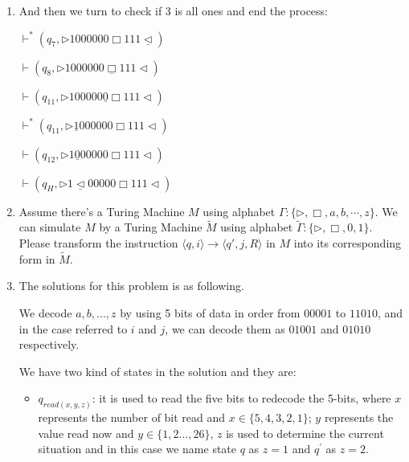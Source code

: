 \documentclass[12pt,a4paper]{article}
\makeatletter
\newtheorem*{solution}{Solution}
\theoremstyle{definition}
\renewenvironment{solution}[1][Solution] {\par\pushQED{\qed}\normalfont\topsep6\p@\@plus6\p@\relax\trivlist\item[\hskip\labelsep\bfseries#1\@addpunct{.}]\ignorespaces}{\popQED\endtrivlist\@endpefalse} \makeatother
\makeatother
\begin{document}
\begin{enumerate}
\begin{solution}
\begin{itemize}
   And then we turn to check if $3$ is all ones and end the process:

   $\vdash^{*} (q_{7},\triangleright  1 0 0 0  0 0 0 \Box 1  1  1 \underline{\triangleleft})$

   $\vdash (q_{8},\triangleright  1 0 0 0  0 0 0 \underline{\Box} 1  1  1 \triangleleft)$
  
   $\vdash (q_{11},\triangleright  1 0 0 0  0 0 \underline{0} \Box 1  1  1 \triangleleft)$

   $\vdash^{*} (q_{11},\triangleright  \underline{1} 0 0 0  0 0 0 \Box 1  1  1 \triangleleft)$

   $\vdash (q_{12},\triangleright  1 \underline{0}  0 0  0 0 0 \Box 1  1  1 \triangleleft)$

   $\vdash (q_{H},\triangleright  1 \underline{\triangleleft}  0 0  0 0 0 \Box 1  1  1 \triangleleft)$


   












\end{itemize}

\end{solution}





\item Assume there's a Turing Machine $M$ using alphabet $\Gamma :\{ \triangleright, \Box, a, b, \cdots, z\}$. We can simulate $M$ by a Turing Machine $\tilde{M}$ using alphabet $\tilde{\Gamma }:\{ \triangleright, \Box, 0, 1\}$. Please transform the instruction $\langle q, i \rangle \rightarrow \langle q',j, R\rangle$ in $M$ into its corresponding form in $\tilde{M}$.


\begin{solution}
    The solutions for this problem is as following.

   We decode $a, b, ..., z$ by using 5 bits of data in order from $00001$ to $11010$, and in the case referred to $i$ and $j$, we can decode them as 
   $01001$ and $01010$ respectively.

	We have two kind of states in the solution and they are:

	\begin{itemize}
		\item \textbf{$q_{read(x,y,z)}$}: it is used to read the five bits to redecode the 5-bits, where $x$ represents the number of bit read and $x\in \{5, 4, 3, 2, 1\}$; $y$ represents the value read now and $y\in \{1,2...,26\}$, $z$ is used
		to determine the current situation and in this case we name state $q$ as $z=1$ and  $q^{'}$ as $z=2$.


\end{itemize}
\end{solution}
\end{enumerate}
\end{document}
